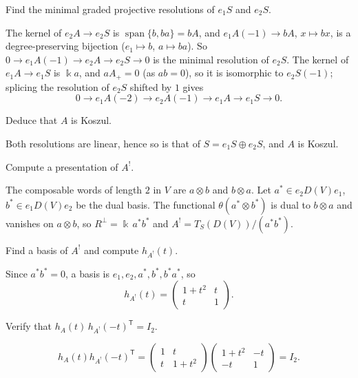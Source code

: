 \documentclass[11pt,a4paper]{exam}
\newcommand{\kk}{\Bbbk}
\begin{document}
\begin{questions}
\begin{parts}
\begin{subparts}
\begin{solution}
\end{solution}
\subpart Find the minimal graded projective resolutions of $e_1S$ and $e_2S$.
\begin{solution}
The kernel of $e_2A\to e_2S$ is $\operatorname{span}\{b,ba\}=bA$, and $e_1A(-1)\to bA$, $x\mapsto bx$, is a degree-preserving bijection ($e_1\mapsto b$, $a\mapsto ba$).
So $0\to e_1A(-1)\to e_2A\to e_2S\to0$ is the minimal resolution of $e_2S$.
The kernel of $e_1A\to e_1S$ is $\kk a$, and $aA_+=0$ (as $ab=0$), so it is isomorphic to $e_2S(-1)$; splicing the resolution of $e_2S$ shifted by $1$ gives
\[
0\to e_1A(-2)\to e_2A(-1)\to e_1A\to e_1S\to0 .
\]
\end{solution}
\subpart Deduce that $A$ is Koszul.
\begin{solution}
Both resolutions are linear, hence so is that of $S=e_1S\oplus e_2S$, and $A$ is Koszul.
\end{solution}
\subpart Compute a presentation of $A^!$.
\begin{solution}
The composable words of length $2$ in $V$ are $a\otimes b$ and $b\otimes a$.
Let $a^*\in e_2D(V)e_1$, $b^*\in e_1D(V)e_2$ be the dual basis.
The functional $\theta(a^*\otimes b^*)$ is dual to $b\otimes a$ and vanishes on $a\otimes b$, so $R^\perp=\kk\,a^*b^*$ and $A^!=T_S(D(V))/(a^*b^*)$.
\end{solution}
\subpart Find a basis of $A^!$ and compute $h_{A^!}(t)$.
\begin{solution}
Since $a^*b^*=0$, a basis is $e_1,e_2,a^*,b^*,b^*a^*$, so
\[
h_{A^!}(t)=\begin{pmatrix}1+t^2&t\\t&1\end{pmatrix}.
\]
\end{solution}
\subpart Verify that $h_A(t)\,h_{A^!}(-t)^{\mathsf T}=I_2$.
\begin{solution}
\[
h_A(t)h_{A^!}(-t)^{\mathsf T}=\begin{pmatrix}1&t\\t&1+t^2\end{pmatrix}\begin{pmatrix}1+t^2&-t\\-t&1\end{pmatrix}=I_2 .
\]
\end{solution}
\end{subparts}

\end{parts}

\end{questions}
\end{document}
